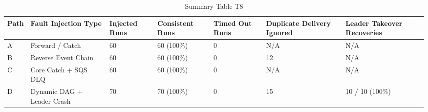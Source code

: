 \begin{table}[htbp]
\centering
\caption{Summary Table T8}
\label{tab:t8}
\begin{tabular}{lllllll}
\toprule
Path & Fault Injection Type & Injected Runs & Consistent Runs & Timed Out Runs & Duplicate Delivery Ignored & Leader Takeover Recoveries \\
\midrule
A & Forward / Catch & 60 & 60 (100\%) & 0 & N/A & N/A \\
B & Reverse Event Chain & 60 & 60 (100\%) & 0 & 12 & N/A \\
C & Core Catch + SQS DLQ & 60 & 60 (100\%) & 0 & N/A & N/A \\
D & Dynamic DAG + Leader Crash & 70 & 70 (100\%) & 0 & 15 & 10 / 10 (100\%) \\
\bottomrule
\end{tabular}
\end{table}
